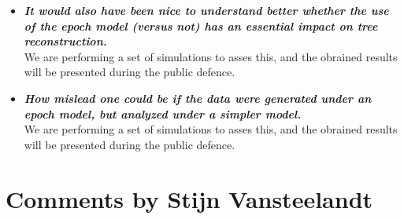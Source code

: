 \documentclass[english]{article}
\begin{document}
\begin{itemize}

\item {
{\it
\textbf{
It would also have been nice to understand better whether the use of the
epoch model (versus not) has an essential impact on tree reconstruction.
}%
}%
}%
\\
We are performing a set of simulations to asses this, and the obrained results will be presented during the public defence.


\item {
{\it
\textbf{
How mislead one could be if the data were generated under an epoch model, but analyzed under a simpler model.
}%
}%
}%
\\
We are performing a set of simulations to asses this, and the obrained results will be presented during the public defence.


\end{itemize}



\section*{Comments by Stijn Vansteelandt}
\end{document}
